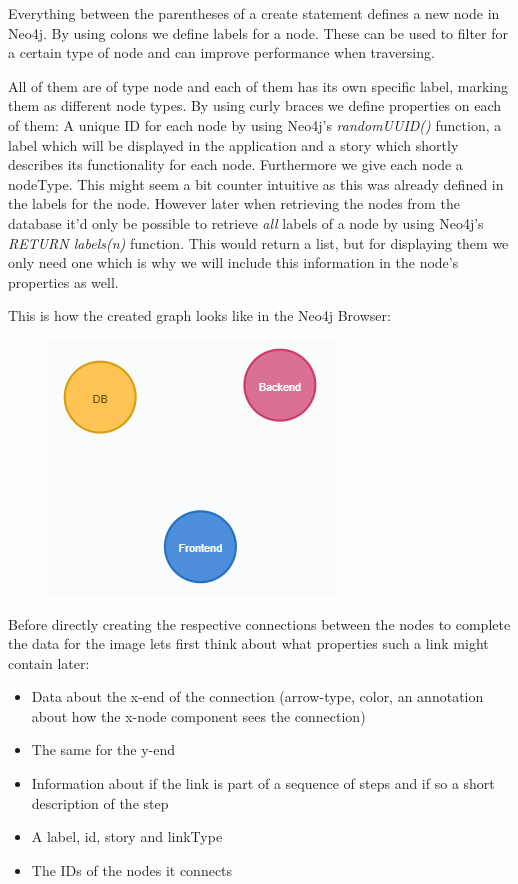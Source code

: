 Everything between the parentheses of a create statement defines a new node in Neo4j. By using colons we define labels for a node. These can be used to filter for a certain type of node and can improve performance when traversing. 

All of them are of type node and each of them has its own specific label, marking them as different node types. By using curly braces we define properties on each of them: A unique ID for each node by using Neo4j's \emph{randomUUID()} function, a label which will be displayed in the application and a story which shortly describes its functionality for each node. Furthermore we give each node a nodeType. This might seem a bit counter intuitive as this was already defined in the labels for the node. However later when retrieving the nodes from the database it'd only be possible to retrieve \emph{all} labels of a node by using Neo4j's \emph{RETURN labels(n)} function. This would return a list, but for displaying them we only need one which is why we will include this information in the node's properties as well.

This is how the created graph looks like in the Neo4j Browser:
\begin{figure}[H]
\centering
\includegraphics[scale=1]{Bilder/BasicGraphNeo1.png}
\label{ex422}
\end{figure}

Before directly creating the respective connections between the nodes to complete the data for the image lets first think about what properties such a link might contain later:
\begin{itemize}
\item Data about the x-end of the connection (arrow-type, color, an annotation about how the x-node component sees the connection)
\item The same for the y-end
\item Information about if the link is part of a sequence of steps and if so a short description of the step
\item A label, id, story and linkType
\item The IDs of the nodes it connects
\end{itemize}

